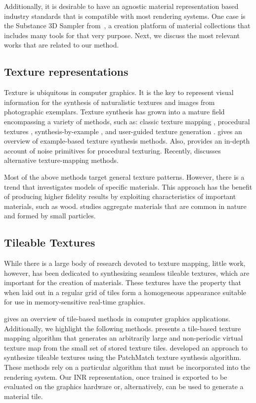Additionally, it is desirable to have an agnostic material representation based industry standards that is compatible with most rendering systems. One case is the Substance 3D Sampler from~\citet{substance_sampler}, a creation platform of material collections that includes many tools for that very purpose. Next, we discuss the most relevant works that are related to our method.


\subsection{Texture representations}

Texture is ubiquitous in computer graphics. It is the key to represent visual information for the synthesis of naturalistic textures and images from photographic exemplars. Texture synthesis has grown into a mature field encompassing a variety of methods, such as: classic texture mapping \cite{blinn76}, procedural textures \cite{perlin-1985}, synthesis-by-example \cite{efros99}, and user-guided texture generation \cite{haeberli90}. \citet{pauly-2009} gives an overview of example-based texture synthesis methods. Also, \citet{etal-2010} provides an in-depth account of noise primitives for procedural texturing.
%
Recently, \citet{rethinkngtex} discusses alternative texture-mapping methods.

Most of the above methods target general texture patterns. However, there is a trend that investigates models of specific materials. This approach has the benefit of producing higher fidelity results by exploiting characteristics of important materials, such as wood.
\citet{dorsey-2004} studies aggregate materials that are common in nature and formed by small particles.

\subsection{Tileable Textures}
While there is a large body of research devoted to texture mapping, little work, however,  has been dedicated to synthesizing seamless tileable textures, which are important for the creation of materials. These textures have the property that when laid out in a regular grid of tiles form a homogeneous appearance suitable for use in memory-sensitive real-time graphics.

\citet{tileinteractive} gives an overview of tile-based methods in computer graphics applications.
%
Additionally, we highlight the following methods. \citet{tilehard} presents a tile-based texture mapping algorithm that generates an arbitrarily large and non-periodic virtual texture map from the small set of stored texture tiles. \citet{Moritz2017Texture} developed an approach to synthesize tileable textures using the PatchMatch texture synthesis algorithm.
These methods rely on a particular algorithm that must be incorporated into the rendering system. Our INR representation, once trained is exported to be evaluated on the graphics hardware or, alternatively, can be used to generate a material tile.

